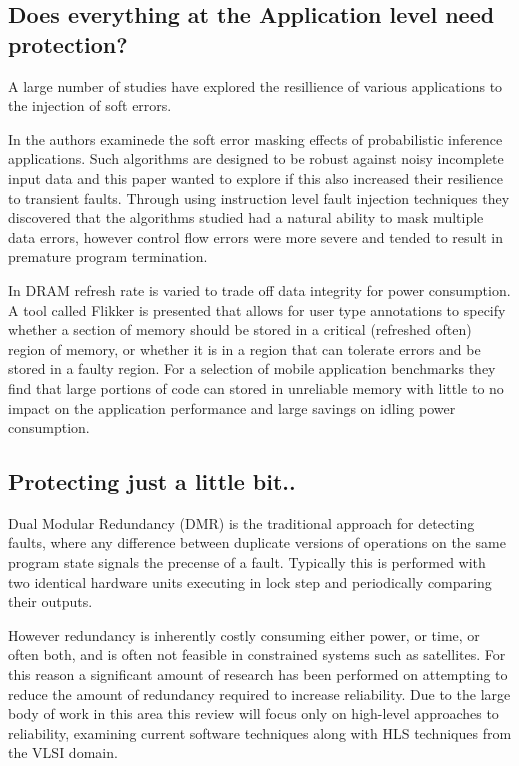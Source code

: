 \subsection{Does everything at the Application level need protection?}
A large number of studies have explored the resillience of various applications to the injection
of soft errors.

In \cite{wong2006soft} the authors examinede the soft error masking effects of probabilistic
inference applications. Such algorithms are designed to be robust against noisy incomplete input
data and this paper wanted to explore if this also increased their resilience to transient faults.
Through using instruction level fault injection techniques they discovered that the algorithms
studied had a natural ability to mask multiple data errors, however control flow errors were more
severe and tended to result in premature program termination.

In \cite{liu2012flikker} DRAM refresh rate is varied to trade off data integrity for power consumption.
A tool called Flikker is presented that allows for user type annotations to specify whether a section of
memory should be stored in a critical (refreshed often) region of memory, or whether it is in a region that
can tolerate errors and be stored in a faulty region.
For a selection of mobile application benchmarks they find that large portions of code can stored in
unreliable memory with little to no impact on the application performance and large savings on idling
power consumption.


\subsection{Protecting just a little bit..}

Dual Modular Redundancy (DMR) is the traditional approach for detecting faults,
where any difference between duplicate versions of operations on the same program state signals
the precense of a fault.
Typically this is performed with two identical hardware units executing in lock step and
periodically comparing their outputs.

However redundancy is inherently costly consuming either power, or time, or often both, and is
often not feasible in constrained systems such as satellites.
For this reason a significant amount of research has been performed on attempting to reduce the amount of
redundancy required to increase reliability.
Due to the large body of work in this area this review will focus only on high-level
approaches to reliability, examining current software techniques along with HLS techniques from the VLSI domain.

